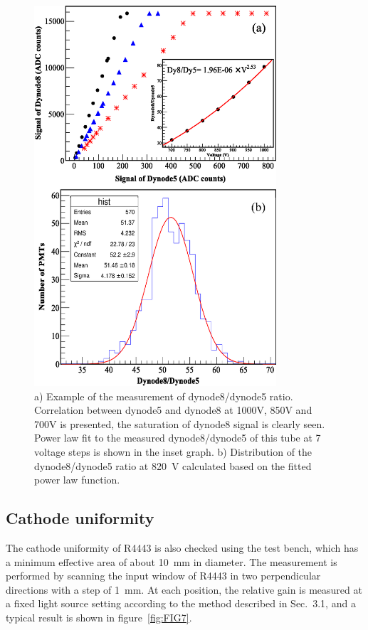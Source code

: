 \documentclass{JINST}
\begin{document}
\begin{figure}[tbp]
	\centering
	\includegraphics[width=90mm]{FIG6}
	\caption{a) Example of the measurement of dynode8/dynode5 ratio.
		Correlation between dynode5 and dynode8 at 1000V, 850V and 700V is presented, the saturation of dynode8 signal is clearly seen.
			Power law fit to the measured dynode8/dynode5 of this tube at 7 voltage steps is shown in the inset graph. b) Distribution of the dynode8/dynode5 ratio at \SI{820}{\volt} calculated based on the fitted power law function.}
	\label{fig:FIG6}
\end{figure} 
	
\subsection{Cathode uniformity}
\label{sec:psd_cathodescan}
	
The cathode uniformity of R4443 is also checked using the test bench, which has a minimum effective area of about \SI{10}{\milli\meter} in diameter.
The measurement is performed by scanning the input window of R4443 in two perpendicular directions with a step of \SI{1}{\milli\meter}.
At each position, the relative gain is measured at a fixed light source setting according to the method described in Sec.~3.1, and a typical result is shown in figure~\ref{fig:FIG7}.
	
\end{document}
